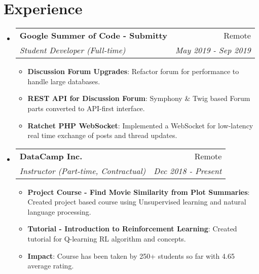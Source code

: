 \documentclass[a4paper,20pt]{article}
\makeatletter
\newcommand{\resumeItem}[2]{
  \item\small{
    \textbf{#1}{: #2 \vspace{-2pt}}
  }
}
\newcommand{\resumeSubheading}[4]{
  \vspace{-1pt}\item
    \begin{tabular*}{0.97\textwidth}{l@{\extracolsep{\fill}}r}
      \textbf{#1} & #2 \\
      \textit{#3} & \textit{#4} \\
    \end{tabular*}\vspace{-5pt}
}
\newcommand{\resumeSubHeadingListStart}{\begin{itemize}[leftmargin=*]}
\newcommand{\resumeSubHeadingListEnd}{\end{itemize}}
\newcommand{\resumeItemListStart}{\begin{itemize}}
\newcommand{\resumeItemListEnd}{\end{itemize}\vspace{-5pt}}
\makeatother
\begin{document}
\section{Experience}
  \resumeSubHeadingListStart
    \resumeSubheading{Google Summer of Code - Submitty}{Remote}
    {Student Developer (Full-time)}{May 2019 - Sep 2019}
    \resumeItemListStart
        \resumeItem{Discussion Forum Upgrades}
          {Refactor forum for performance to handle large databases.}
          \resumeItem{REST API for Discussion Forum}
          {Symphony \& Twig based Forum parts converted to API-first interface.}
          \resumeItem{Ratchet PHP WebSocket}{Implemented a WebSocket for low-latency real time exchange of posts and thread updates.}
      \resumeItemListEnd
\vspace{-5pt}
    \resumeSubheading
		{DataCamp Inc.}{Remote}
		{Instructor (Part-time, Contractual)}{Dec 2018 -  Present}
		\resumeItemListStart
        \resumeItem{Project Course - Find Movie Similarity from Plot Summaries}
          {Created project based course using Unsupervised learning and natural language processing.}
        \resumeItem{Tutorial - Introduction to Reinforcement Learning}
          {Created tutorial for Q-learning RL algorithm and  concepts.}
        \resumeItem{Impact}{Course has been taken by 250+ students so far with 4.65 average rating.}
		\resumeItemListEnd

\resumeSubHeadingListEnd

\vspace{-5pt}
\end{document}
